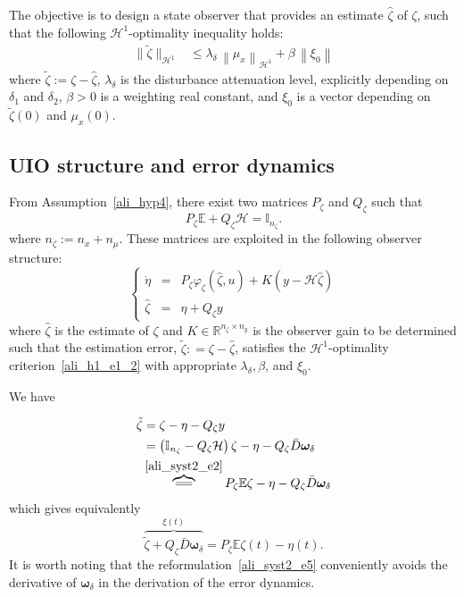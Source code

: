 The objective is to design a state observer that provides an estimate $\hat{\zeta}$ of $\zeta$, such that the following $\mathcal{H}^1$-optimality inequality holds:
%
\begin{align}%
\| \tilde{\zeta} \|_{\mathcal{H}^{1}} &\leq \lambda_{\delta} \, \left\| \mu_{x} \right\|_{\mathcal{H}^{1}}  + \beta \, \left\| \xi_0 \right\| \label{ali_h1_e1_2}
\end{align}
where $\tilde{\zeta} := \zeta - \hat{\zeta}$, $\lambda_{\delta}$ is the disturbance attenuation level, explicitly depending on $\delta_1$ and $\delta_2$, $\beta > 0$ is a weighting real constant, and $\xi_0$ is a vector depending on $\tilde{\zeta}(0)$ and $\mu_{x}(0)$.%
\subsection{UIO structure and error dynamics}
From Assumption~\ref{ali_hyp4},  there exist two matrices $P_{\zeta}$ and $Q_{\zeta}$ such that
\begin{equation}\label{ali_syst2_e2}
 P_{\zeta} \mathbb{E} + Q_{\zeta} \mathcal{H} = \mathbb{I}_{n_{\zeta}}.
\end{equation}
where $n_{\zeta} := n_{x} + n_{\mu}$. These matrices are exploited in the following observer structure:
\begin{equation}\label{ali_syst2_e3}
\left\{
\begin{array}{rcl}
\dot{\eta} & = & P_{\zeta} \varphi_{\zeta}(\hat{\zeta},u) + K \left( y - \mathcal{H} \hat{\zeta} \right)
\\
\hat{\zeta} & = & \eta + Q_{\zeta} y 
\end{array}
\right.
\end{equation}
where $\hat{\zeta}$ is the estimate of $\zeta$ and $K \in\mathbb{R}^{n_{\zeta} \times n_y}$ is the observer gain to be determined such that the estimation error, $\tilde{\zeta} : = \zeta - \hat{\zeta}$, satisfies the $\mathcal{H}^1$-optimality criterion~\eqref{ali_h1_e1_2} with appropriate $\lambda_{\delta}, \beta$, and $\xi_0$.
%

We have 

\begin{align}\label{ali_syst2_e4}
\tilde{\zeta} &= \zeta - \eta - Q_{\zeta} y \notag \\
&= \left(\mathbb{I}_{n_{\zeta}} - Q_{\zeta} \mathcal{H}\right) \zeta - \eta - Q_{\zeta} \bar{D} \bm{\omega}_{\delta} \notag \\
&\overbrace{ \mathrel{\scalebox{2}[1]{=}} }^{\eqref{ali_syst2_e2}} P_{\zeta} \mathbb{E} \zeta - \eta - Q_{\zeta} \bar{D} \bm{\omega}_{\delta}
\end{align}
which gives equivalently
\begin{equation}\label{ali_syst2_e5}
\overbrace{ \tilde{\zeta} + Q_{\zeta} \bar{D} \bm{\omega}_{\delta} }^{\xi(t)} = P_{\zeta} \mathbb{E} \zeta(t) - \eta(t).
\end{equation}
It is worth noting that the reformulation~\eqref{ali_syst2_e5} conveniently avoids the derivative of $\bm{\omega}_{\delta}$ in the derivation of the error dynamics.

